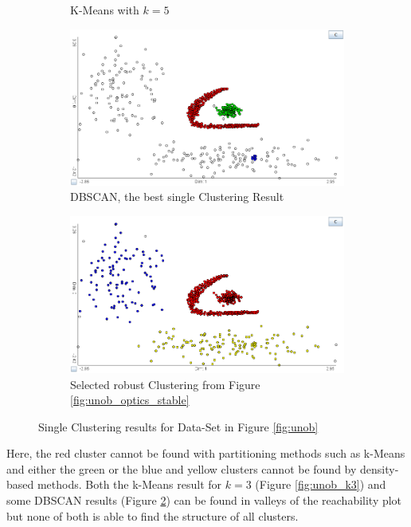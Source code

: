 \documentclass[
	a4paper,
	english,
	twoside,
	openright,               
	11pt                            
	]{report}
\begin{document}
\begin{figure}[h]
\begin{subfigure}[t]{.49\textwidth}
  \caption{K-Means with $k=5$}
  \label{fig:unob_k5ex}
\end{subfigure}
\hfill
\begin{subfigure}[t]{.49\textwidth}
  \centering
  \includegraphics[width=.98\linewidth]{unob_best}
  \caption{DBSCAN, the best single Clustering Result}
  \label{fig:unob_best}
\end{subfigure}
\medskip
\begin{subfigure}[t]{.49\textwidth}
	\centering
	\includegraphics[width=.98\linewidth]{unob_stable}
	\caption{Selected robust Clustering from Figure \ref{fig:unob_optics_stable}}
	\label{fig:unob_stable}
\end{subfigure}
\caption{Single Clustering results for Data-Set in Figure \ref{fig:unob}}
\label{fig:single}
\end{figure}


Here, the red cluster cannot be found with partitioning methods such as k-Means and either the green or the blue and yellow clusters cannot be found by density-based methods. Both the k-Means result for $k=3$ (Figure \ref{fig:unob_k3}) and some DBSCAN results (Figure \ref{fig:unob_best}) can be found in valleys of the reachability plot but none of both is able to find the structure of all clusters.
\end{document}
